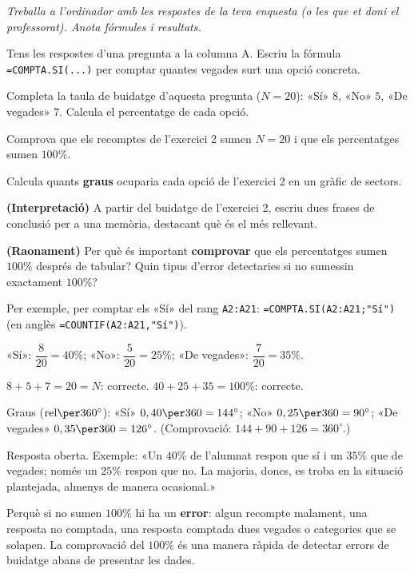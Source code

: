 \noindent\textit{Treballa a l'ordinador amb les respostes de la teva enquesta (o les
que et doni el professorat). Anota fórmules i resultats.}

\begin{exercicis}
\begin{exlist}
  \item Tens les respostes d'una pregunta a la columna A. Escriu la fórmula
        \texttt{=COMPTA.SI(...)} per comptar quantes vegades surt una opció concreta.
  \item Completa la taula de buidatge d'aquesta pregunta ($N=20$): «Sí» $8$, «No» $5$,
        «De vegades» $7$. Calcula el percentatge de cada opció.
  \item Comprova que els recomptes de l'exercici 2 sumen $N=20$ i que els percentatges
        sumen $100\%$.
  \item Calcula quants \textbf{graus} ocuparia cada opció de l'exercici 2 en un gràfic
        de sectors.
  \item \textbf{(Interpretació)} A partir del buidatge de l'exercici 2, escriu dues
        frases de conclusió per a una memòria, destacant què és el més rellevant.
  \item \textbf{(Raonament)} Per què és important \textbf{comprovar} que els
        percentatges sumen $100\%$ després de tabular? Quin tipus d'error detectaries
        si no sumessin exactament $100\%$?
\end{exlist}
\end{exercicis}

\begin{solucions}
\begin{sollist}
  \item Per exemple, per comptar els «Sí» del rang \texttt{A2:A21}:
        \texttt{=COMPTA.SI(A2:A21;"Sí")} (en anglès \texttt{=COUNTIF(A2:A21,"Sí")}).
  \item «Sí»: $\dfrac{8}{20}=40\%$; «No»: $\dfrac{5}{20}=25\%$; «De vegades»:
        $\dfrac{7}{20}=35\%$.
  \item $8+5+7=20=N$: correcte. $40+25+35=100\%$: correcte.
  \item Graus ($\text{rel}\per 360^\circ$): «Sí» $0,40\per 360=144^\circ$; «No»
        $0,25\per 360=90^\circ$; «De vegades» $0,35\per 360=126^\circ$. (Comprovació:
        $144+90+126=360^\circ$.)
  \item Resposta oberta. Exemple: «Un $40\%$ de l'alumnat respon que sí i un $35\%$ que
        de vegades; només un $25\%$ respon que no. La majoria, doncs, es troba en la
        situació plantejada, almenys de manera ocasional.»
  \item Perquè si no sumen $100\%$ hi ha un \textbf{error}: algun recompte malament,
        una resposta no comptada, una resposta comptada dues vegades o categories que
        se solapen. La comprovació del $100\%$ és una manera ràpida de detectar errors
        de buidatge abans de presentar les dades.
\end{sollist}
\end{solucions}
